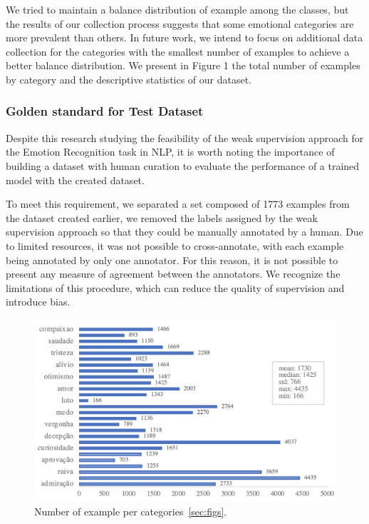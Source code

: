 \documentclass[12pt]{article}
\begin{document}
 We tried to maintain a balance distribution of example among the classes, but the results of our collection process suggests that some emotional categories are more prevalent than others. In future work, we intend to focus on additional data collection for the categories with the smallest number of examples to achieve a better balance distribution. We present in Figure 1 the total number of examples by category and the descriptive statistics of our dataset.
 
 \subsubsection{Golden standard for Test Dataset}
Despite this research studying the feasibility of the weak supervision approach for the Emotion Recognition task in NLP, it is worth noting the importance of building a dataset with human curation to evaluate the performance of a trained model with the created dataset.

To meet this requirement, we separated a set composed of 1773 examples from the dataset created earlier, we removed the labels assigned by the weak supervision approach so that they could be manually annotated by a human. Due to limited resources, it was not possible to cross-annotate, with each example being annotated by only one annotator. For this reason, it is not possible to present any measure of agreement between the annotators. We recognize the limitations of this procedure, which can reduce the quality of supervision and introduce bias.


\begin{figure}
\centering
\includegraphics[width=.85\textwidth]{img-n-tables/qt-emotion.png}
\caption{Number of example per categories~\ref{sec:figs}.}
\label{fig:exampleFig2}
\end{figure}
\end{document}
